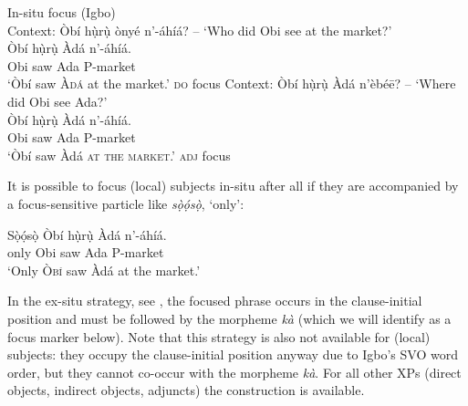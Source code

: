 \documentclass[output=paper,colorlinks,citecolor=brown]{langscibook}
\begin{document}
\ea%
    \label{ex:amaechi:3}
    In-situ focus (Igbo)\\
    \ea\label{ex:amaechi:3a}
    Context: Òbí hụ̀rụ̀ ònyé n'-áhíá? -- `Who did Obi see at the market?'\\
    \gll    Òbí hụ̀rụ̀ Àdá n'-áhíá.\\
            Obi saw Ada P-market\\
    \glt    `Òbí saw \textsc{Àdá} at the market.' \hfill{\small \textsc{do} focus}
    \ex\label{ex:amaechi:3b}
    Context: Òbí hụ̀rụ̀ Àdá n'èbé\=e? -- `Where did Obi see Ada?'\\
    \gll    Òbí hụ̀rụ̀ Àdá n'-áhíá.\\
            Obi saw Ada P-market\\
    \glt    `Òbí saw Àdá \textsc{at the market}.' \hfill{\small \textsc{adj} focus}
    \z
\z

It is possible to focus (local) subjects in-situ after all if they are accompanied by a focus-sensitive particle like \textit{sọ̀ọ́sọ̀}, `only':

\ea%
    \label{ex:amaechi:4}
    \gll    Sọ̀ọ́sọ̀ Òbí hụ̀rụ̀ Àdá n'-áhíá.\\
            only Obi saw Ada P-market\\
    \glt    `Only \textsc{Òbí} saw Àdá at the market.'
\z

In the ex-situ strategy, see , the focused phrase occurs in the clause-initial position and must be followed by the morpheme \textit{k\`a} (which we will identify as a focus marker below). Note that this strategy is also not available for (local) subjects: they occupy the clause-initial position anyway due to Igbo's  SVO word order, but they cannot co-occur with the morpheme \textit{k\`a}. For all other XPs (direct objects, indirect objects, adjuncts) the construction is available.
\end{document}

